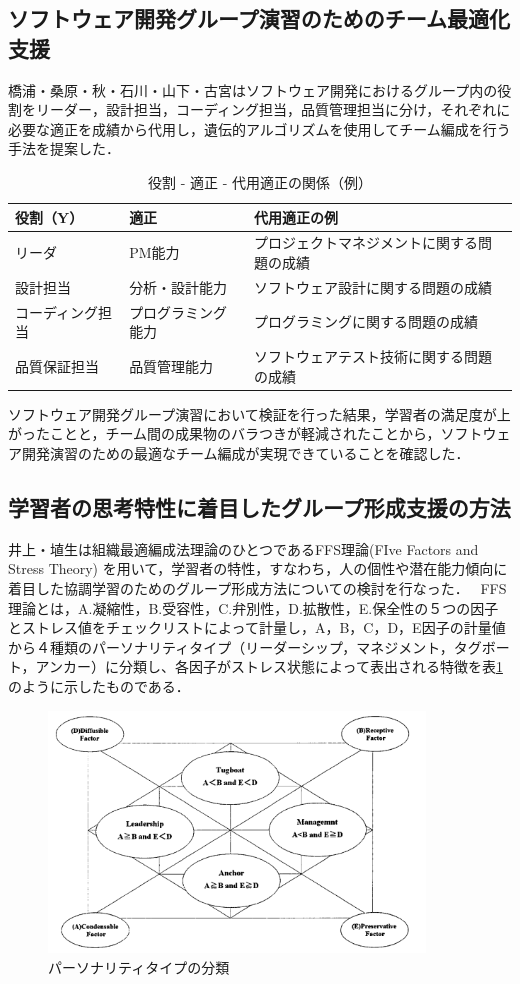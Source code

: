 \documentclass{funthesis}
\begin{document}
\subsection{ソフトウェア開発グループ演習のためのチーム最適化支援}
橋浦・桑原・秋・石川・山下・古宮\cite{A6}はソフトウェア開発におけるグループ内の役割をリーダー，設計担当，コーディング担当，品質管理担当に分け，それぞれに必要な適正を成績から代用し，遺伝的アルゴリズムを使用してチーム編成を行う手法を提案した．
\begin{table}[h]
\begin{center}
  \begin{tabular}{lll} \hline
    役割（Y） & 適正 & 代用適正の例\tabularnewline \hline
    リーダ & PM能力 & プロジェクトマネジメントに関する問題の成績\tabularnewline
    設計担当 &分析・設計能力 & 
    ソフトウェア設計に関する問題の成績\tabularnewline
    コーディング担当&プログラミング能力 &
    プログラミングに関する問題の成績\tabularnewline
    品質保証担当&品質管理能力 &
    ソフトウェアテスト技術に関する問題の成績\tabularnewline
    \hline
  \end{tabular}
  \caption{役割 - 適正 - 代用適正の関係（例）}
  \label{適正}
  \end{center}
\end{table}
ソフトウェア開発グループ演習において検証を行った結果，学習者の満足度が上がったことと，チーム間の成果物のバラつきが軽減されたことから，ソフトウェア開発演習のための最適なチーム編成が実現できていることを確認した．


\subsection{学習者の思考特性に着目したグループ形成支援の方法}
井上・埴生は\cite{A7}組織最適編成法理論のひとつであるFFS理論(FIve Factors and Stress Theory)
\cite{A8}を用いて，学習者の特性，すなわち，人の個性や潜在能力傾向に着目した協調学習のためのグループ形成方法についての検討を行なった．
\ FFS理論とは，A.凝縮性，B.受容性，C.弁別性，D.拡散性，E.保全性の５つの因子とストレス値をチェックリストによって計量し，A，B，C，D，E因子の計量値から４種類のパーソナリティタイプ（リーダーシップ，マネジメント，タグボート，アンカー）に分類し、各因子がストレス状態によって表出される特徴を表\ref{FFS}のように示したものである．\cite{A9}
\begin{figure}[h]
 \centering
   \includegraphics[width=100mm]{figures/FFS.png}
 \caption{パーソナリティタイプの分類}
 \label{FFS}
\end{figure}
\end{document}
